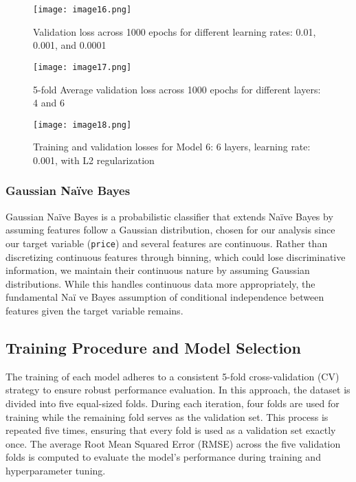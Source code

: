 \documentclass{article}
\begin{document}
\begin{figure}[H]
   \centering
   \texttt{[image: image16.png]}  %
   \caption{Validation loss across 1000 epochs for different learning rates: 0.01, 0.001, and 0.0001}
   \label{fig:brand_dist}
\end{figure}

\begin{figure}[H]
   \centering
   \texttt{[image: image17.png]}  %
   \caption{5-fold Average validation loss across 1000 epochs for different layers: 4 and 6}
   \label{fig:brand_dist}
\end{figure}

\begin{figure}[H]
   \centering
   \texttt{[image: image18.png]}  %
   \caption{Training and validation losses for Model 6: 6 layers, learning rate: 0.001, with L2 regularization}
   \label{fig:brand_dist}
\end{figure}

\subsubsection{Gaussian Na\"{i}ve Bayes}

Gaussian Na\"{i}ve Bayes is a probabilistic classifier that extends Na\"{i}ve Bayes by assuming features follow a Gaussian distribution, chosen for our analysis since our target variable (\texttt{price}) and several features are continuous. Rather than discretizing continuous features through binning, which could lose discriminative information, we maintain their continuous nature by assuming Gaussian distributions. While this handles continuous data more appropriately, the fundamental Na\"{i}
ve Bayes assumption of conditional independence between features given the target variable remains.

\subsection{Training Procedure and Model Selection} 
The training of each model adheres to a consistent 5-fold cross-validation (CV) strategy to ensure robust performance evaluation. In this approach, the dataset is divided into five equal-sized folds. During each iteration, four folds are used for training while the remaining fold serves as the validation set. This process is repeated five times, ensuring that every fold is used as a validation set exactly once. The average Root Mean Squared Error (RMSE) across the five validation folds is computed to evaluate the model’s performance during training and hyperparameter tuning.
\end{document}
